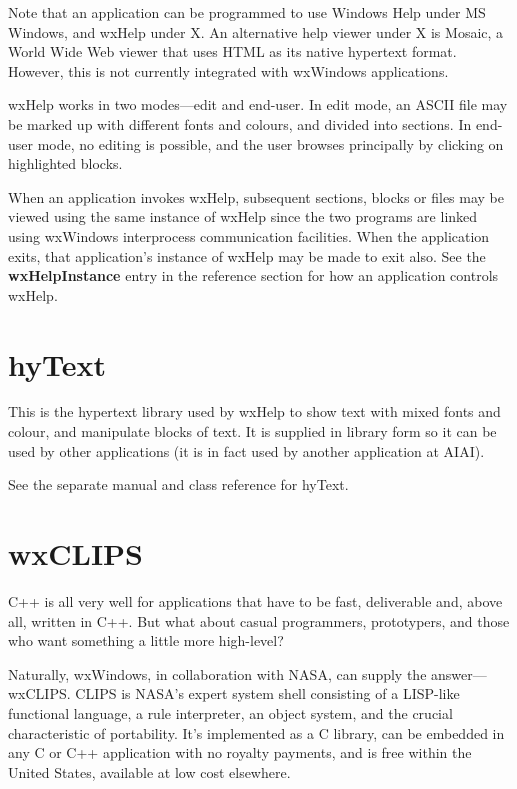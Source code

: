 Note that an application can be programmed to use Windows Help under
MS Windows, and wxHelp under X. An alternative help viewer under X is
Mosaic, a World Wide Web viewer that uses HTML as its native hypertext
format. However, this is not currently integrated with wxWindows
applications.

wxHelp works in two modes---edit and end-user. In edit mode, an ASCII
file may be marked up with different fonts and colours, and divided into
sections. In end-user mode, no editing is possible, and the user browses
principally by clicking on highlighted blocks.

When an application invokes wxHelp, subsequent sections, blocks or
files may be viewed using the same instance of wxHelp since the two
programs are linked using wxWindows interprocess communication
facilities. When the application exits, that application's instance of
wxHelp may be made to exit also.  See the {\bf wxHelpInstance} entry in the
reference section for how an application controls wxHelp.

\section{hyText}\label{hytext}

This is the hypertext library used by wxHelp to show text with mixed
fonts and colour, and manipulate blocks of text. It is supplied in
library form so it can be used by other applications (it is in fact used
by another application at AIAI).

See the separate manual and class reference for hyText.

\section{wxCLIPS}\label{clips}

C++ is all very well for applications that have to be fast, deliverable
and, above all, written in C++. But what about casual programmers,
prototypers, and those who want something a little more high-level?

Naturally, wxWindows, in collaboration with NASA, can supply the
answer---wxCLIPS. CLIPS is NASA's expert system shell consisting of a
LISP-like functional language, a rule interpreter, an object system, and
the crucial characteristic of portability. It's implemented as a C
library, can be embedded in any C or C++ application with no royalty
payments, and is free within the United States, available at low
cost elsewhere.

